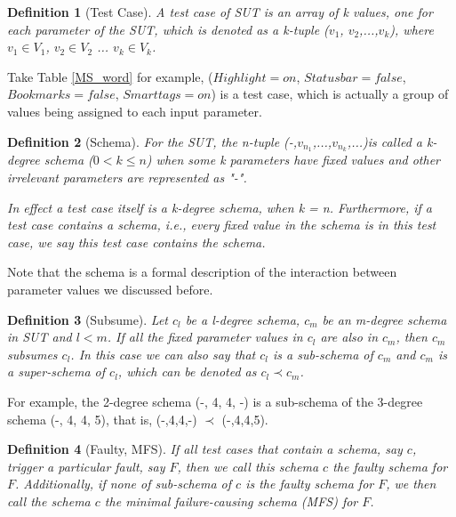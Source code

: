 \documentclass[10pt,journal,cspaper,compsoc]{IEEEtran}
\begin{document}
\newtheorem{definition}{Definition}
\newtheorem{assumption}{Assumption}
\newtheorem{proposition}{Proposition}

\begin{definition}[Test Case]\label{de:test}
A \emph{test case} of SUT is an array of \emph{k} values, one for each parameter of the SUT, which is denoted as a \emph{k}-tuple ($v_{1}$, $v_{2}$,...,$v_{k}$), where $v_{1}\in V_{1}$, $v_{2} \in V_{2}$ ... $v_{k} \in V_{k}$.
\end{definition}

Take Table \ref{MS_word} for example, ($Highlight = on$, $Status bar = false$, $Bookmarks = false$, $Smart tags = on$) is a test case, which is actually a group of values being assigned to each input parameter.

\begin{definition}[Schema]\label{de:tuple}
For the SUT, the \emph{n}-tuple (-,$v_{n_{1}}$,...,$v_{n_{k}}$,...)is called a \emph{k}-degree \emph{schema} ($0 < k \leq n $) when some k parameters have fixed values and other irrelevant parameters are represented as "-".

In effect a test case itself is a k-degree \emph{schema}, when k = n. Furthermore, if a test case contains a \emph{schema}, i.e., every fixed value in the schema is in this test case, we say this test case \emph{contains} the \emph{schema}.
\end{definition}
Note that the schema is a formal description of the interaction between parameter values we discussed before.

\begin{definition}[Subsume]\label{de:sub}
Let $c_{l}$ be a \emph{l}-degree schema, $c_{m}$ be an \emph{m}-degree schema in SUT and $l < m$. If all the fixed parameter values in $c_{l}$ are also in $c_{m}$, then $c_{m}$ \emph{subsumes} $c_{l}$. In this case we can also say that $c_{l}$ is a \emph{sub-schema} of $c_{m}$ and $c_{m}$ is a \emph{super-schema} of $c_{l}$, which can be denoted as $c_{l} \prec  c_{m}$.
\end{definition}

For example,  the 2-degree schema (-, 4, 4, -) is a sub-schema of the 3-degree schema (-, 4, 4, 5), that is, (-,4,4,-) $\prec$ (-,4,4,5).

\begin{definition}[Faulty, MFS]\label{de:faulty:minimal}
If all test cases that contain a schema, say $c$, trigger a particular fault, say $F$, then we call this schema $c$ the \emph{faulty schema} for $F$. Additionally, if none of sub-schema of $c$ is the \emph{faulty schema} for $F$, we then call the schema $c$ the \emph{minimal failure-causing schema (MFS)} \cite{nie2011minimal} for $F$.
\end{definition}
\end{document}
